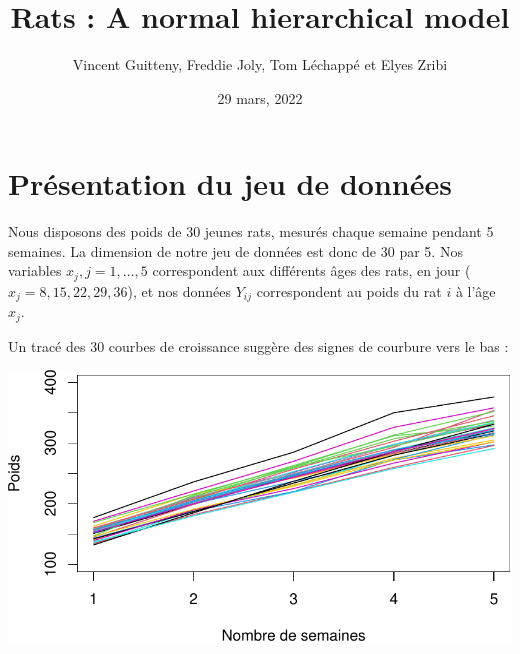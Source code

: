 \documentclass[
]{article}
\title{Rats : A normal hierarchical model}
\author{Vincent Guitteny, Freddie Joly, Tom Léchappé et Elyes Zribi}
\date{29 mars, 2022}
\begin{document}
\maketitle

\newenvironment{cols}[1][]{}{}
\newenvironment{col}[1]{\begin{minipage}{#1}\ignorespaces}{%
\end{minipage}
\ifhmode\unskip\fi
\aftergroup\useignorespacesandallpars}
\def\useignorespacesandallpars#1\ignorespaces\fi{%
#1\fi\ignorespacesandallpars}
\makeatletter
\def\ignorespacesandallpars{%
  \@ifnextchar\par
    {\expandafter\ignorespacesandallpars\@gobble}%
    {}%
}
\makeatother

\renewcommand\contentsname{Table des matières}
\newpage
\tableofcontents
\newpage

\hypertarget{pruxe9sentation-du-jeu-de-donnuxe9es}{%
\section{Présentation du jeu de
données}\label{pruxe9sentation-du-jeu-de-donnuxe9es}}

Nous disposons des poids de 30 jeunes rats, mesurés chaque semaine
pendant 5 semaines. La dimension de notre jeu de données est donc de 30
par 5. Nos variables \(x_j,j=1,…,5\) correspondent aux différents âges
des rats, en jour (\(x_j = {8,15,22,29,36}\)), et nos données \(Y_{ij}\)
correspondent au poids du rat \(i\) à l'âge \(x_j\).

Un tracé des 30 courbes de croissance suggère des signes de courbure
vers le bas :

\begin{center}\includegraphics{Rats---A-normal-hierarchical-model_files/figure-latex/unnamed-chunk-1-1} \end{center}
\end{document}

